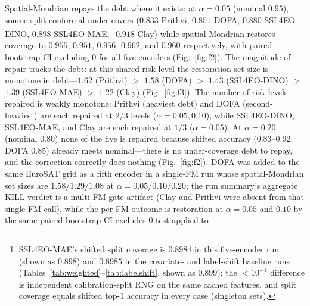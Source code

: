 \documentclass[11pt]{article}
\begin{document}
Spatial-Mondrian repays the debt where it exists: at $\alpha=0.05$ (nominal $0.95$), source
split-conformal under-covers ($0.833$ Prithvi, $0.851$ DOFA, $0.880$ SSL4EO-DINO, $0.898$ SSL4EO-MAE,\footnote{%
SSL4EO-MAE's shifted split coverage is $0.8984$ in this five-encoder run (shown as $0.898$) and $0.8985$ in the
covariate- and label-shift baseline runs (Tables~\ref{tab:weighted}--\ref{tab:labelshift}, shown as $0.899$);
the ${<}10^{-4}$ difference is independent calibration-split RNG on the same cached features, and split coverage
equals shifted top-1 accuracy in every case (singleton sets).} $0.918$ Clay)
while spatial-Mondrian restores coverage to $0.955$, $0.951$, $0.956$, $0.962$, and $0.960$ respectively,
with paired-bootstrap CI excluding $0$ for all five encoders (Fig.~\ref{fig:f2}). The magnitude of repair tracks the debt:
at this shared risk level the restoration set size is monotone in debt---$1.62$ (Prithvi) $>$ $1.58$ (DOFA) $>$ $1.43$
(SSL4EO-DINO) $>$ $1.39$ (SSL4EO-MAE) $>$ $1.22$ (Clay) (Fig.~\ref{fig:f3}).
The number of risk levels repaired is weakly monotone: Prithvi (heaviest debt) and DOFA (second-heaviest) are each repaired at $2/3$
levels ($\alpha=0.05,0.10$), while SSL4EO-DINO, SSL4EO-MAE, and Clay are each repaired at $1/3$ ($\alpha=0.05$). At
$\alpha=0.20$ (nominal $0.80$) none of the five is repaired because shifted accuracy ($0.83$--$0.92$, DOFA $0.85$) already meets
nominal---there is no under-coverage debt to repay, and the correction correctly does nothing
(Fig.~\ref{fig:f2}). DOFA was added to the same EuroSAT grid as a fifth encoder in a single-FM run whose
spatial-Mondrian set sizes are $1.58/1.29/1.08$ at $\alpha=0.05/0.10/0.20$; the run summary's aggregate KILL
verdict is a multi-FM gate artifact (Clay and Prithvi were absent from that single-FM call), while the per-FM
outcome is restoration at $\alpha=0.05$ and $0.10$ by the same paired-bootstrap CI-excludes-$0$ test applied to
\end{document}
